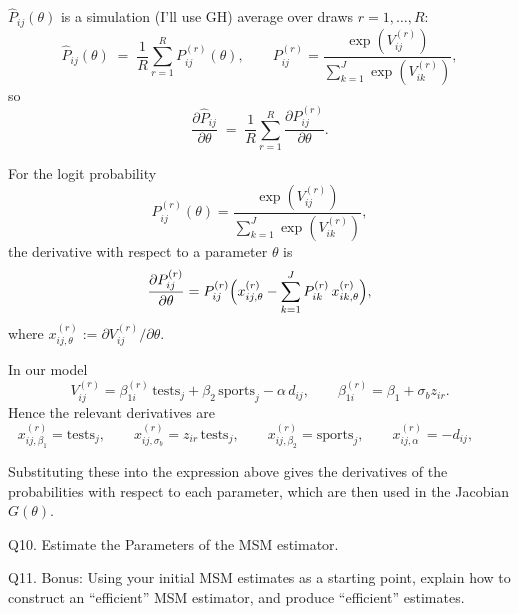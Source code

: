 \documentclass{article}
\begin{document}
$\hat P_{ij}(\theta)$ is a simulation (I'll use GH) average over draws $r=1,\ldots,R$:
\[
\hat P_{ij}(\theta)\;=\;\frac{1}{R}\sum_{r=1}^R P^{(r)}_{ij}(\theta),\qquad
P^{(r)}_{ij}=\frac{\exp(V^{(r)}_{ij})}{\sum_{k=1}^J \exp(V^{(r)}_{ik})},
\]
so
\[
\frac{\partial \hat P_{ij}}{\partial \theta}
\;=\;\frac{1}{R}\sum_{r=1}^R \frac{\partial P^{(r)}_{ij}}{\partial \theta}.
\]

For the logit probability
\[
P^{(r)}_{ij}(\theta)
= \frac{\exp(V^{(r)}_{ij})}{\sum_{k=1}^J \exp(V^{(r)}_{ik})},
\]
the derivative with respect to a parameter $\theta$ is
\[
\frac{\partial P^{(r)}_{ij}}{\partial \theta}
= P^{(r)}_{ij}\Bigl(x^{(r)}_{ij,\theta}
- \sum_{k=1}^J P^{(r)}_{ik}\,x^{(r)}_{ik,\theta}\Bigr),
\]
where $x^{(r)}_{ij,\theta} := \partial V^{(r)}_{ij}/\partial\theta$.

\vspace{5mm}

In our model 
\[
V^{(r)}_{ij}
= \beta_{1i}^{(r)}\,\text{tests}_j
+ \beta_2\,\text{sports}_j
- \alpha\,d_{ij},
\qquad
\beta_{1i}^{(r)}=\beta_1+\sigma_b z_{ir}.
\]
Hence the relevant derivatives are
\[
x^{(r)}_{ij,\beta_1}=\text{tests}_j,\qquad
x^{(r)}_{ij,\sigma_b}=z_{ir}\,\text{tests}_j,\qquad
x^{(r)}_{ij,\beta_2}=\text{sports}_j,\qquad
x^{(r)}_{ij,\alpha}=-d_{ij},\qquad
\]

Substituting these into the expression above gives the derivatives of the probabilities with respect to each parameter, which are then used in the Jacobian $G(\theta)$.

\begin{tcolorbox}
Q10. Estimate the Parameters of the MSM estimator.
\end{tcolorbox}

\begin{table}[H]
\centering
{}
\caption{Estimation results for logit models.}
\end{table}

\begin{tcolorbox}
Q11. Bonus: Using your initial MSM estimates as a starting point, explain how to construct an ``efficient'' MSM estimator, and produce ``efficient'' estimates.
\end{tcolorbox}
\end{document}

